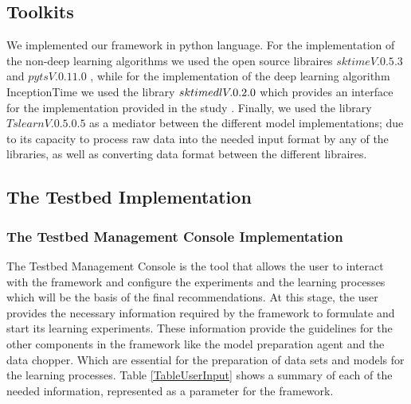 \subsection{Toolkits}
\label{SubsectionToolkits}
We implemented our framework in python language.
For the implementation of the non-deep learning algorithms we used the open source libraires $sktime V. 0.5.3$ \cite{loning2019sktime} and $pyts V. 0.11.0$ \cite{JMLR:v21:19-763},
while for the implementation of the deep learning algorithm InceptionTime we used the library $sktime\-dl V .0.2.0$ which provides an interface for the implementation provided
in the study \cite{fawaz2020inceptiontime}. Finally, we used the library $Tslearn V. 0.5.0.5$ \cite{JMLR:v21:20-091} as a mediator between the different model implementations; due to its
capacity to process raw data into the needed input format by any of the libraries, as well as converting data format between the different libraires.

\subsection{The Testbed Implementation}
\label{SubsectionTestbedImplementation}

\subsubsection{The Testbed Management Console Implementation}
\label{SubsectionTestbedManagementConsoleImplementation}
The Testbed Management Console is the tool that allows the user to interact with the framework and configure the experiments
and the learning processes which will be the basis of the final recommendations.
At this stage, the user provides the necessary information required by the framework to formulate and start its learning experiments.
These information provide the guidelines for the other components in the framework like the model preparation agent and the data chopper.
Which are essential for the preparation of data sets and models for the learning processes.
Table \ref{TableUserInput} shows a summary of each of the needed information, represented as a parameter for the framework.

